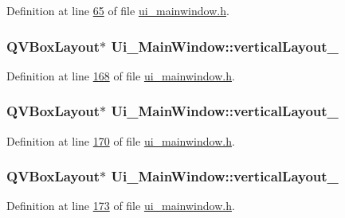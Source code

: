 Definition at line \hyperlink{a00139_source_l00065}{65} of file \hyperlink{a00139_source}{ui\+\_\+mainwindow.\+h}.

\hypertarget{a00080_a0c01bad60d9f422a1258e710635a2f65}{
\subsubsection[{vertical\+Layout\+\_\+2}]{\setlength{\rightskip}{0pt plus 5cm}Q\+V\+Box\+Layout$\ast$ Ui\+\_\+\+Main\+Window\+::vertical\+Layout\+\_}}\label{a00080_a0c01bad60d9f422a1258e710635a2f65}


Definition at line \hyperlink{a00139_source_l00168}{168} of file \hyperlink{a00139_source}{ui\+\_\+mainwindow.\+h}.

\hypertarget{a00080_a38b8a4b887f3b58e2a49e7905ae6f1f0}{
\subsubsection[{vertical\+Layout\+\_\+3}]{\setlength{\rightskip}{0pt plus 5cm}Q\+V\+Box\+Layout$\ast$ Ui\+\_\+\+Main\+Window\+::vertical\+Layout\+\_}}\label{a00080_a38b8a4b887f3b58e2a49e7905ae6f1f0}


Definition at line \hyperlink{a00139_source_l00170}{170} of file \hyperlink{a00139_source}{ui\+\_\+mainwindow.\+h}.

\hypertarget{a00080_a6f40fc110b15410c00837a446d57bdbe}{
\subsubsection[{vertical\+Layout\+\_\+4}]{\setlength{\rightskip}{0pt plus 5cm}Q\+V\+Box\+Layout$\ast$ Ui\+\_\+\+Main\+Window\+::vertical\+Layout\+\_}}\label{a00080_a6f40fc110b15410c00837a446d57bdbe}


Definition at line \hyperlink{a00139_source_l00173}{173} of file \hyperlink{a00139_source}{ui\+\_\+mainwindow.\+h}.

